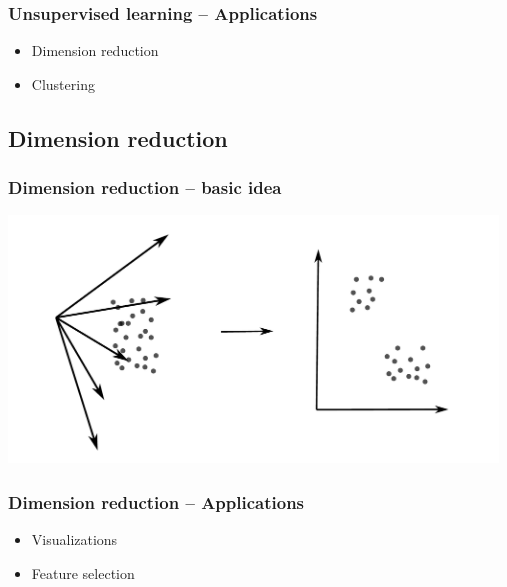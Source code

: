\documentclass[aspectratio=169]{beamer}
\begin{document}
\setcounter{tocdepth}{2}
\begin{frame}{}
   \tableofcontents[currentsubsection,hideothersubsections,
     subsectionstyle=show/shaded]
\end{frame}

\begin{frame}
  \frametitle{Unsupervised learning -- Applications}
  \begin{block}{}
    \begin{itemize}
    \item Dimension reduction
    \item Clustering
    \end{itemize}
  \end{block}
\end{frame}

\subsection{Dimension reduction}

\setcounter{tocdepth}{2}
\begin{frame}{}
   \tableofcontents[currentsubsection,hideothersubsections,
     subsectionstyle=show/shaded]
\end{frame}

\begin{frame}
  \frametitle{Dimension reduction -- basic idea}
  \begin{center}
    \includegraphics[width=13.0cm]{images/dimension_reduction.pdf}
  \end{center}
\end{frame}

\begin{frame}
  \frametitle{Dimension reduction -- Applications}
  \begin{block}{}
    \begin{center}
      \begin{itemize}
      \item Visualizations
      \item Feature selection
      \end{itemize}
    \end{center}
  \end{block}
\end{frame}
\end{document}
